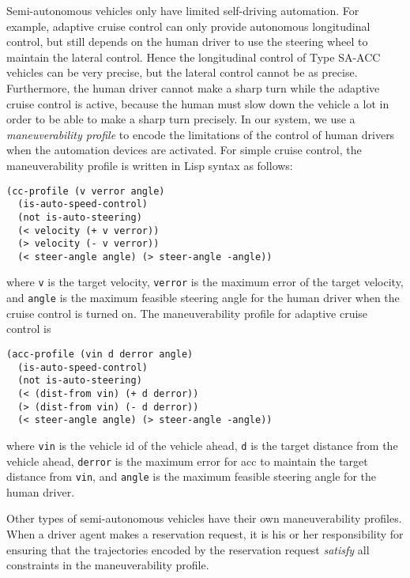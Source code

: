 Semi-autonomous vehicles only have limited self-driving automation.
For example, adaptive cruise control can only provide autonomous
longitudinal control, but still depends on the human driver to use the
steering wheel to maintain the lateral control.  Hence the
longitudinal control of Type SA-ACC vehicles can be very precise, but
the lateral control cannot be as precise.  Furthermore, the human
driver cannot make a sharp turn while the adaptive cruise control is
active, because the human must slow down the vehicle a lot in order to
be able to make a sharp turn precisely.  In our system, we use a
\emph{maneuverability profile} to encode the limitations of the
control of human drivers when the automation devices are activated.
For simple cruise control, the maneuverability profile is written in
Lisp syntax as follows:
\begin{small}
\begin{verbatim}
(cc-profile (v verror angle)
  (is-auto-speed-control)
  (not is-auto-steering)
  (< velocity (+ v verror))
  (> velocity (- v verror))
  (< steer-angle angle) (> steer-angle -angle))
\end{verbatim}
\end{small}
\noindent
where \texttt{v} is the target velocity, \texttt{verror} is the
maximum error of the target velocity, and \texttt{angle} is the
maximum feasible steering angle for the human driver when the cruise
control is turned on.  The maneuverability profile for adaptive cruise
control is
\begin{small}
\begin{verbatim}
(acc-profile (vin d derror angle)
  (is-auto-speed-control)
  (not is-auto-steering)
  (< (dist-from vin) (+ d derror))
  (> (dist-from vin) (- d derror))
  (< steer-angle angle) (> steer-angle -angle))
\end{verbatim}
\end{small}
\noindent
where \texttt{vin} is the vehicle id of the vehicle ahead,
\texttt{d} is the target distance from the vehicle ahead, \texttt{derror}
is the maximum error for acc to maintain the target distance from
\texttt{vin}, and \texttt{angle} is the maximum feasible steering
angle for the human driver.

Other types of semi-autonomous vehicles have their own maneuverability
profiles.  When a driver agent makes a reservation request, it is
his or her responsibility for ensuring that the trajectories encoded by the
reservation request \emph{satisfy} all constraints in the
maneuverability profile.

